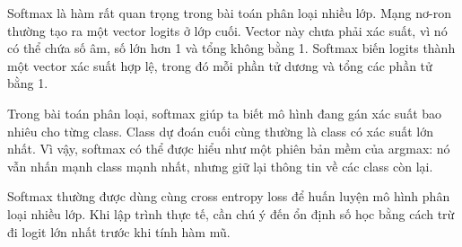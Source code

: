 \documentclass[12pt,a4paper]{report}
\begin{document}
Softmax là hàm rất quan trọng trong bài toán phân loại nhiều lớp. Mạng nơ-ron thường tạo ra một vector logits ở lớp cuối. Vector này chưa phải xác suất, vì nó có thể chứa số âm, số lớn hơn 1 và tổng không bằng 1. Softmax biến logits thành một vector xác suất hợp lệ, trong đó mỗi phần tử dương và tổng các phần tử bằng 1.

Trong bài toán phân loại, softmax giúp ta biết mô hình đang gán xác suất bao nhiêu cho từng class. Class dự đoán cuối cùng thường là class có xác suất lớn nhất. Vì vậy, softmax có thể được hiểu như một phiên bản mềm của argmax: nó vẫn nhấn mạnh class mạnh nhất, nhưng giữ lại thông tin về các class còn lại.

Softmax thường được dùng cùng cross entropy loss để huấn luyện mô hình phân loại nhiều lớp. Khi lập trình thực tế, cần chú ý đến ổn định số học bằng cách trừ đi logit lớn nhất trước khi tính hàm mũ.
\end{document}
